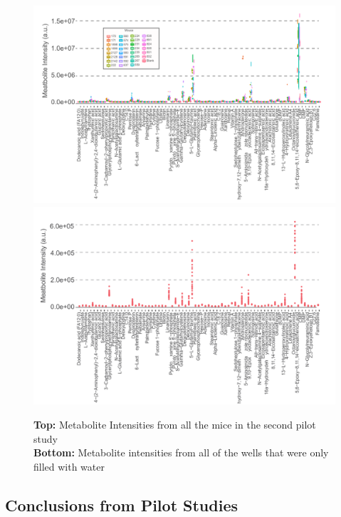 \documentclass[a4paper]{book}
\begin{document}
\begin{figure}[hbt!]
	\centering
	\includegraphics[width=\linewidth]{2.Optimizaiton_Figures/TIC_All_Mice_Final}
	\includegraphics[width=\linewidth]{2.Optimizaiton_Figures/TIC_Blank_Final}
	\caption{\textbf{Top:} Metabolite Intensities from all the mice in the second pilot study \\ \textbf{Bottom:} Metabolite intensities from all of the wells that were only filled with water}
	\label{fig:TIC of Mouse Metabolties and Blanks}
\end{figure}
	
	
	
	\subsection*{Conclusions from Pilot Studies}
	
\end{document}
